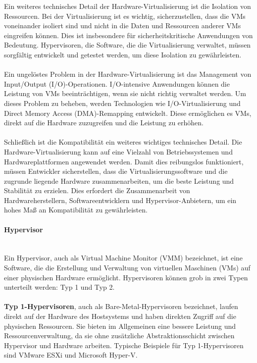 \documentclass[../vs-script-first-v01.tex]{subfiles}
\begin{document}
Ein weiteres technisches Detail der Hardware-Virtualisierung ist die Isolation von Ressourcen. Bei der Virtualisierung ist es wichtig, sicherzustellen, dass die VMs voneinander isoliert sind und nicht in die Daten und Ressourcen anderer VMs eingreifen können. Dies ist insbesondere für sicherheitskritische Anwendungen von Bedeutung. Hypervisoren, die Software, die die Virtualisierung verwaltet, müssen sorgfältig entwickelt und getestet werden, um diese Isolation zu gewährleisten.
\\\\
Ein ungelöstes Problem in der Hardware-Virtualisierung ist das Management von Input/Output (I/O)-Operationen. I/O-intensive Anwendungen können die Leistung von VMs beeinträchtigen, wenn sie nicht richtig verwaltet werden. Um dieses Problem zu beheben, werden Technologien wie I/O-Virtualisierung und Direct Memory Access (DMA)-Remapping entwickelt. Diese ermöglichen es VMs, direkt auf die Hardware zuzugreifen und die Leistung zu erhöhen.
\\\\
Schließlich ist die Kompatibilität ein weiteres wichtiges technisches Detail. Die Hardware-Virtualisierung kann auf eine Vielzahl von Betriebssystemen und Hardwareplattformen angewendet werden. Damit dies reibungslos funktioniert, müssen Entwickler sicherstellen, dass die Virtualisierungssoftware und die zugrunde liegende Hardware zusammenarbeiten, um die beste Leistung und Stabilität zu erzielen. Dies erfordert die Zusammenarbeit von Hardwareherstellern, Softwareentwicklern und Hypervisor-Anbietern, um ein hohes Maß an Kompatibilität zu gewährleisten. 
\paragraph{Hypervisor\\\\}
Ein Hypervisor, auch als Virtual Machine Monitor (VMM) bezeichnet, ist eine Software, die die Erstellung und Verwaltung von virtuellen Maschinen (VMs) auf einer physischen Hardware ermöglicht. Hypervisoren können grob in zwei Typen unterteilt werden: Typ 1 und Typ 2.
\\\\
\textbf{Typ 1-Hypervisoren}, auch als Bare-Metal-Hypervisoren bezeichnet, laufen direkt auf der Hardware des Hostsystems und haben direkten Zugriff auf die physischen Ressourcen. Sie bieten im Allgemeinen eine bessere Leistung und Ressourcenverwaltung, da sie ohne zusätzliche Abstraktionsschicht zwischen Hypervisor und Hardware arbeiten. Typische Beispiele für Typ 1-Hypervisoren sind VMware ESXi und Microsoft Hyper-V.
\end{document}
